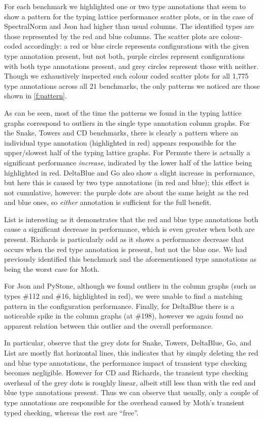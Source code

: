\documentclass[sigplan,screen]{acmart}
\begin{document}
For each benchmark we highlighted one or two type annotations that seem to show a pattern for the typing lattice performance scatter plots, or in the case of SpectralNorm and Json had higher than usual columns. The identified types are those represented by the red and blue columns. The scatter plots are colour-coded accordingly: a red or blue circle represents configurations with the given type annotation present, but not both, purple circles represent configurations with both type annotations present, and grey circles represent those with neither. Though we exhaustively inspected such colour coded scatter plots for all 1,775 type annotations across all 21 benchmarks, the only patterns we noticed are those shown in \ref{f:pattern}.

As can be seen, most of the time the patterns we found in the typing lattice graphs correspond to outliers in the single type annotation column graphs. For the Snake, Towers and CD benchmarks, there is clearly a pattern where an individual type annotation (highlighted in red) appears responsible for the upper/slowest half of the typing lattice graphs. For Permute there is actually a significant performance \emph{increase}, indicated by the lower half of the lattice being highlighted in red. DeltaBlue and Go also show a slight increase in performance, but here this is caused by two type annotations (in red and blue); this effect is not cumulative, however: the purple dots are about the same height as the red and blue ones, so \emph{either} annotation is sufficient for the full benefit.

List is interesting as it demonstrates that the red and blue type annotations both cause a significant decrease in performance, which is even greater when both are present. Richards is particularly odd as it shows a performance decrease that occurs when the red type annotation is present, but not the blue one. We had previously identified this benchmark and the aforementioned type annotations \cite{roberts-and-co-ecoop-2019} as being the worst case for Moth.

For Json and PyStone, although we found outliers in the column graphs (such as types \#112 and \#16, highlighted in red), we were unable to find a matching pattern in the configuration performance.
Finally, for DeltaBlue there is a noticeable spike in the column graphs (at \#198), however we again found no apparent relation between this outlier and the overall performance.

In particular, observe that the grey dots for Snake, Towers, DeltaBlue, Go, and List are mostly flat horizontal lines, this indicates that by simply deleting the red and blue type annotations, the performance impact of transient type checking becomes negligible. However for CD and Richards, the transient type checking overhead of the grey dots is roughly linear, albeit still less than with the red and blue type annotations present. Thus we can observe that usually, only a couple of type annotations are responsible for the overhead caused by Moth's transient typed checking, whereas the rest are ``free''.
\end{document}

